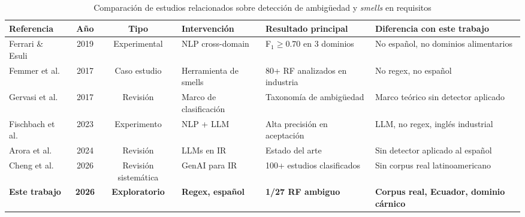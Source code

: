 \begin{table}[ht]
\centering
\caption{Comparación de estudios relacionados sobre detección de ambigüedad y \textit{smells} en requisitos}
\label{tab:related-work}
\begin{tabularx}{\linewidth}{p{2.8cm}ccp{2.5cm}p{2.5cm}p{3cm}}
\toprule
\textbf{Referencia} & \textbf{Año} & \textbf{Tipo} & \textbf{Intervención} & \textbf{Resultado principal} & \textbf{Diferencia con este trabajo} \\
\midrule
Ferrari \& Esuli~\cite{ferrari2019nlp}
  & 2019 & Experimental & NLP cross-domain & F$_1 \geq 0.70$ en 3 dominios & No español, no dominios alimentarios \\
Femmer et al.~\cite{femmer2017smells}
  & 2017 & Caso estudio & Herramienta de smells & 80+ RF analizados en industria & No regex, no español \\
Gervasi et al.~\cite{gervasi2017ambiguity}
  & 2017 & Revisión & Marco de clasificación & Taxonomía de ambigüedad & Marco teórico sin detector aplicado \\
Fischbach et al.~\cite{fischbach2023acceptance}
  & 2023 & Experimento & NLP + LLM & Alta precisión en aceptación & LLM, no regex, inglés industrial \\
Arora et al.~\cite{arora2024genai}
  & 2024 & Revisión & LLMs en IR & Estado del arte & Sin detector aplicado al español \\
Cheng et al.~\cite{cheng2026genai}
  & 2026 & Revisión sistemática & GenAI para IR & 100+ estudios clasificados & Sin corpus real latinoamericano \\
\midrule
\textbf{Este trabajo} & \textbf{2026} & \textbf{Exploratorio} & \textbf{Regex, español} & \textbf{1/27 RF ambiguo} & \textbf{Corpus real, Ecuador, dominio cárnico} \\
\bottomrule
\end{tabularx}
\end{table}
